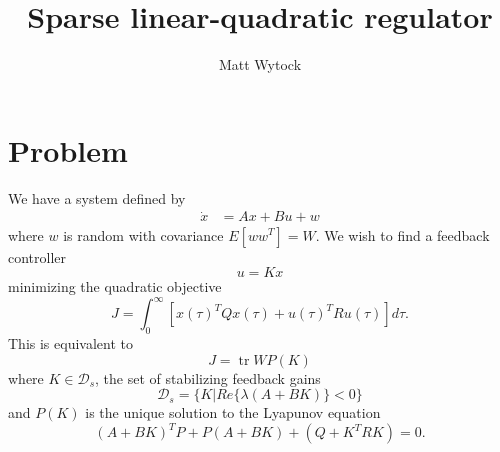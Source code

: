 \documentclass[12pt]{article}
\title{Sparse linear-quadratic regulator}
\author{Matt Wytock}
\DeclareMathOperator*{\tr}{\mathrm{tr}}
\begin{document}
\maketitle

\section{Problem}
We have a system defined by
\begin{equation}
\begin{split}
\dot{x} &= Ax + Bu + w
\end{split}
\end{equation}
where $w$ is random with covariance $E[ww^T] = W$. We wish to find a feedback
controller
\begin{equation}
u = Kx
\end{equation}
minimizing the quadratic objective
\begin{equation}
J = \int_0^\infty \left[ x(\tau)^TQx(\tau) + u(\tau)^TRu(\tau) \right] d\tau.
\end{equation}
This is equivalent to
\begin{equation}
J = \tr WP(K)
\end{equation}
where $K \in \mathcal{D}_s$, the set of stabilizing feedback gains
\begin{equation}
\mathcal{D}_s = \{ K | Re\{\lambda(A + BK)\} < 0 \}
\end{equation}
and $P(K)$ is the unique solution to the Lyapunov equation
\begin{equation}
(A + BK)^TP + P(A + BK) + (Q + K^TRK) = 0.
\end{equation}
\end{document}

